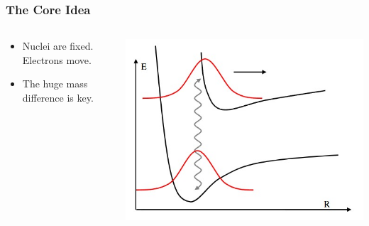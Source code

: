 \begin{frame}
    \frametitle{The Core Idea}
    \begin{columns}[T]
        \begin{column}{0.4\textwidth}
            \vspace{2cm}
            \begin{itemize}
                \item Nuclei are fixed. Electrons move.
                \item The huge mass difference is key.
            \end{itemize}
        \end{column}
        \begin{column}{0.5\textwidth}
            \includegraphics[width=\textwidth]{images/BO_app.png}
        \end{column}
    \end{columns}
\end{frame}

